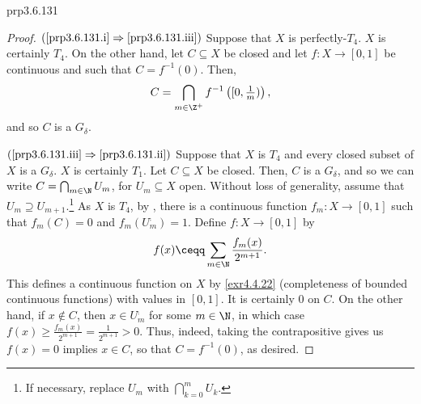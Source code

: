 \begin{prp}{}{prp3.6.131}
\begin{proof}
\blankline
\noindent
$(\cref{prp3.6.131.i}\Rightarrow \cref{prp3.6.131.iii})$ Suppose that $X$ is perfectly-$T_4$.  $X$ is certainly $T_4$.  On the other hand, let $C\subseteq X$ be closed and let $f\colon X\rightarrow [0,1]$ be continuous and such that $C=f^{-1}(0)$.  Then,
\begin{equation}
C=\bigcap _{m\in \Z ^+}f^{-1}\left( [0,\tfrac{1}{m})\right) ,
\end{equation}
and so $C$ is a $G_{\delta}$.

\blankline
\noindent
$(\cref{prp3.6.131.iii}\Rightarrow \cref{prp3.6.131.ii})$ Suppose that $X$ is $T_4$ and every closed subset of $X$ is a $G_{\delta}$.  $X$ is certainly $T_1$.  Let $C\subseteq X$ be closed.  Then, $C$ is a $G_{\delta}$, and so we can write $C=\bigcap _{m\in \N}U_m$, for $U_m\subseteq X$ open.  Without loss of generality, assume that $U_m\supseteq U_{m+1}$.\footnote{If necessary, replace $U_m$ with $\bigcap _{k=0}^mU_k$.}  As $X$ is $T_4$, by , there is a continuous function $f_m\colon X\rightarrow [0,1]$ such that $f_m(C)=0$ and $f_m(U_m^{\comp})=1$.  Define $f\colon X\rightarrow [0,1]$ by
\begin{equation}
f(x)\ceqq \sum _{m\in \N}\frac{f_m(x)}{2^{m+1}}.
\end{equation}
This defines a continuous function on $X$ by \cref{exr4.4.22} (completeness of bounded continuous functions) with values in $[0,1]$.  It is certainly $0$ on $C$.  On the other hand, if $x\notin C$, then $x\in U_m^{\comp}$ for some $m\in \N$, in which case $f(x)\geq \frac{f_m(x)}{2^{m+1}}=\frac{1}{2^{m+1}}>0$.  Thus, indeed, taking the contrapositive gives us $f(x)=0$ implies $x\in C$, so that $C=f^{-1}(0)$, as desired.
\end{proof}
\end{prp}
